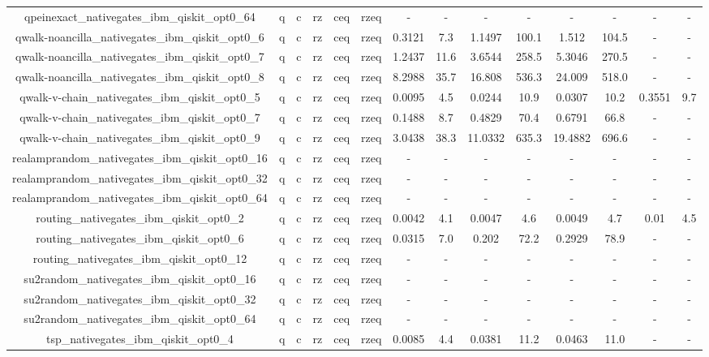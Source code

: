\begin{table}[htb]
{\begin{tabular}{|c|c|c|c|c|c|c|c|c|c|c|c|c|c|}
qpeinexact_nativegates_ibm_qiskit_opt0_64 & q & c & rz & ceq & rzeq & - & - & - & - & - & - & - & - \\ 
qwalk-noancilla_nativegates_ibm_qiskit_opt0_6 & q & c & rz & ceq & rzeq & 0.3121 & 7.3 & 1.1497 & 100.1 & 1.512 & 104.5 & - & - \\ 
qwalk-noancilla_nativegates_ibm_qiskit_opt0_7 & q & c & rz & ceq & rzeq & 1.2437 & 11.6 & 3.6544 & 258.5 & 5.3046 & 270.5 & - & - \\ 
qwalk-noancilla_nativegates_ibm_qiskit_opt0_8 & q & c & rz & ceq & rzeq & 8.2988 & 35.7 & 16.808 & 536.3 & 24.009 & 518.0 & - & - \\ 
qwalk-v-chain_nativegates_ibm_qiskit_opt0_5 & q & c & rz & ceq & rzeq & 0.0095 & 4.5 & 0.0244 & 10.9 & 0.0307 & 10.2 & 0.3551 & 9.7 \\ 
qwalk-v-chain_nativegates_ibm_qiskit_opt0_7 & q & c & rz & ceq & rzeq & 0.1488 & 8.7 & 0.4829 & 70.4 & 0.6791 & 66.8 & - & - \\ 
qwalk-v-chain_nativegates_ibm_qiskit_opt0_9 & q & c & rz & ceq & rzeq & 3.0438 & 38.3 & 11.0332 & 635.3 & 19.4882 & 696.6 & - & - \\ 
realamprandom_nativegates_ibm_qiskit_opt0_16 & q & c & rz & ceq & rzeq & - & - & - & - & - & - & - & - \\ 
realamprandom_nativegates_ibm_qiskit_opt0_32 & q & c & rz & ceq & rzeq & - & - & - & - & - & - & - & - \\ 
realamprandom_nativegates_ibm_qiskit_opt0_64 & q & c & rz & ceq & rzeq & - & - & - & - & - & - & - & - \\ 
routing_nativegates_ibm_qiskit_opt0_2 & q & c & rz & ceq & rzeq & 0.0042 & 4.1 & 0.0047 & 4.6 & 0.0049 & 4.7 & 0.01 & 4.5 \\ 
routing_nativegates_ibm_qiskit_opt0_6 & q & c & rz & ceq & rzeq & 0.0315 & 7.0 & 0.202 & 72.2 & 0.2929 & 78.9 & - & - \\ 
routing_nativegates_ibm_qiskit_opt0_12 & q & c & rz & ceq & rzeq & - & - & - & - & - & - & - & - \\ 
su2random_nativegates_ibm_qiskit_opt0_16 & q & c & rz & ceq & rzeq & - & - & - & - & - & - & - & - \\ 
su2random_nativegates_ibm_qiskit_opt0_32 & q & c & rz & ceq & rzeq & - & - & - & - & - & - & - & - \\ 
su2random_nativegates_ibm_qiskit_opt0_64 & q & c & rz & ceq & rzeq & - & - & - & - & - & - & - & - \\ 
tsp_nativegates_ibm_qiskit_opt0_4 & q & c & rz & ceq & rzeq & 0.0085 & 4.4 & 0.0381 & 11.2 & 0.0463 & 11.0 & - & - \\ 

\end{tabular}}
\end{table}
